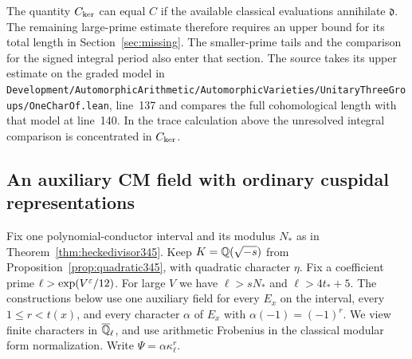 \documentclass[a4paper,11pt]{article}
\theoremstyle{definition}
\theoremstyle{remark}
\newcommand{\srcloc}[2]{{\small\nolinkurl{#1.lean}}, line~#2}
\numberwithin{equation}{section}
\begin{document}
The quantity \(C_{\rm ker}\) can equal \(C\) if the available
classical evaluations annihilate \(\mathfrak d\). The remaining
large-prime estimate therefore requires an upper bound for its total
length in
Section~\ref{sec:missing}. The smaller-prime tails and the
comparison for the signed integral period also enter that section.
The source takes its upper estimate on the graded model in
\srcloc{Development/AutomorphicArithmetic/AutomorphicVarieties/UnitaryThreeGroups/OneCharOf}{137}
and compares the full cohomological length with that model at
line~140. In the trace calculation above the unresolved integral
comparison is concentrated in \(C_{\rm ker}\).


\subsection{An auxiliary CM field with ordinary cuspidal representations}\label{sec:seed361}

Fix one polynomial-conductor interval and its modulus \(N_*\) as in
Theorem~\ref{thm:heckedivisor345}. Keep \(K=\mathbb Q(\sqrt{-s})\) from
Proposition~\ref{prop:quadratic345}, with quadratic character \(\eta\).
Fix a coefficient prime \(\ell>\exp(V^\varepsilon/12)\). For large \(V\)
we have \(\ell>sN_*\) and \(\ell>4t_*+5\).
The constructions below use one auxiliary field for every \(E_x\)
on the interval, every \(1\le r<t(x)\), and every character
\(\alpha\) of \(E_x\) with \(\alpha(-1)=(-1)^r\). We view finite
characters in \(\overline{\mathbb Q}_\ell\), and use arithmetic Frobenius
in the classical modular form normalization.
Write \(\Psi=\alpha\kappa_\ell^r\).
\end{document}
